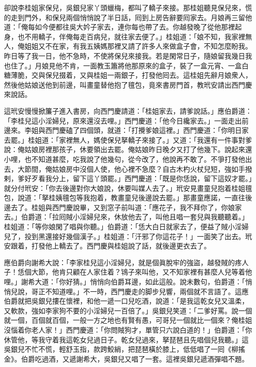 卻說李桂姐家保兒，吳銀兒家丫頭蠟梅，都叫了轎子來接。那桂姐聽見保兒來，慌的走到門外，和保兒兩個悄悄說了半日話，囘到上房告辭要囘家去。月娘再三留他道：「俺每如今便都往吳大妗子家去，連你每也帶了去。你越發晚了從他那裡起身，也不用轎子，伴俺每走百病兒，就往家去便了。」桂姐道：「娘不知，我家裡無人，俺姐姐又不在家，有我五姨媽那裡又請了許多人來做盒子會，不知怎麼盼我。昨日等了我一日，他不急時，不使將保兒來接我。若是閑常日子，隨娘留我幾日我也住了。」月娘見他不肯，一面教玉簫將他那原來的盒子，裝了一盒元宵、一盒白糖薄脆，交與保兒掇着，又與桂姐一兩銀子，打發他囘去。這桂姐先辭月娘衆人，然後他姑娘送他到前邊，叫畫童替他抱了氊包，竟來書房門首，教玳安請出西門慶來說話。

這玳安慢慢掀簾子進入書房，向西門慶請道：「桂姐家去，請爹說話。」應伯爵道：「李桂兒這小淫婦兒，原來還沒去哩。」西門慶道：「他今日纔家去。」一面走出前邊來。李姐與西門慶磕了四個頭，就道：「打攪爹娘這裡。」西門慶道：「你明日家去罷。」桂姐道：「家裡無人，媽使保兒拏轎子來接了。」又道：「我還有一件事對爹說：俺姑娘房裡那孩子，休要領出去罷。俺姑娘昨日晚夕又打了他幾下。說起來還小哩，也不知道甚麼，吃我說了他幾句，從今改了，他說再不敢了。不爭打發他出去，大節間，俺姑娘房中沒個人使，他心裡不急麼？自古木杓火杖兒短，強如手撥剌，爹好歹看我分上，留下這丫頭罷。」西門慶道：「既是你恁說，留下這奴才罷。」就分付玳安：「你去後邊對你大娘說，休要叫媒人去了。」玳安見畫童兒抱着桂姐氊包，說道：「拏桂姨氊包等我抱着，教畫童兒後邊說去罷。」那畫童應諾，一直往後邊去了。桂姐與西門慶說畢，又到窓子前叫道：「應花子，我不拜你了，你娘家去。」伯爵道：「拉囘賊小淫婦兒來，休放他去了，叫他且唱一套兒與我聽聽着。」桂姐道：「等你娘閑了唱與你聽。」伯爵道：「恁大白日就家去了，便益了賊小淫婦兒了，投到黑還接好幾個漢子。」桂姐道：「汗邪了你這花子！」一面笑了出去。玳安跟着，打發他上轎去了。西門慶與桂姐說了話，就後邊更衣去了。

應伯爵向謝希大說：「李家桂兒這小淫婦兒，就是個眞脫牢的強盜，越發賊的疼人子！恁個大節，他肯只顧在人家住着？鴇子來叫他，又不知家裡有甚麼人兒等着他哩。」謝希大道：「你好猜。」悄悄向伯爵耳邊，如此這般。說未數句，伯爵道：「悄悄兒說，哥正不知道哩。」{}不一時，西門慶走的脚步兒響，兩個就不言語了。這應伯爵就把吳銀兒摟在懷裡，和他一遞一口兒吃酒，說道：「是我這乾女兒又溫柔，又軟款，強如李家狗不要的小淫婦兒一百倍了。」吳銀兒笑道：「二爹好罵。說一個就一個，百個就百個，一般一方之地也有賢有愚，可哥兒一個就比一個來？俺桂姐沒惱着你老人家！」西門慶道：「你問賊狗才，單管只六說白道的！」伯爵道：「你休管他，等我守着我這乾女兒過日子。乾女兒過來，拏琵琶且先唱個兒我聽。」這吳銀兒不忙不慌，輕舒玉指，款跨鮫綃，把琵琶橫於膝上，低低唱了一囘《柳搖金》。伯爵吃過酒，又遞謝希大，吳銀兒又唱了一套。這裡吳銀兒遞酒彈唱不題。

